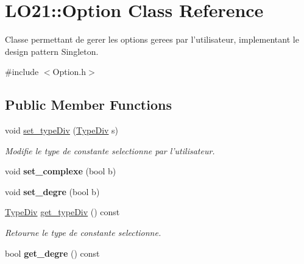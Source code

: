 \hypertarget{class_l_o21_1_1_option}{\section{\-L\-O21\-:\-:\-Option \-Class \-Reference}
\label{class_l_o21_1_1_option}
}


\-Classe permettant de gerer les options gerees par l'utilisateur, implementant le design pattern \-Singleton.  




{\ttfamily \#include $<$\-Option.\-h$>$}

\subsection*{\-Public \-Member \-Functions}
\begin{DoxyCompactItemize}
\item 
void \hyperlink{class_l_o21_1_1_option_a22b390cfd4b7ac74b656549d0a4b9e5a}{set\-\_\-type\-Div} (\hyperlink{_option_8h_aa88892c4cb734ae333411b4409f27f72}{\-Type\-Div} s)
\begin{DoxyCompactList}\small\item\em \-Modifie le type de constante selectionne par l'utilisateur. \end{DoxyCompactList}\item 
\hypertarget{class_l_o21_1_1_option_a9c7b2191e0dd3daa235a43aafa317126}{void {\bfseries set\-\_\-complexe} (bool b)}\label{class_l_o21_1_1_option_a9c7b2191e0dd3daa235a43aafa317126}

\item 
\hypertarget{class_l_o21_1_1_option_aa5de72b352852815e35d205796f04d77}{void {\bfseries set\-\_\-degre} (bool b)}\label{class_l_o21_1_1_option_aa5de72b352852815e35d205796f04d77}

\item 
\hyperlink{_option_8h_aa88892c4cb734ae333411b4409f27f72}{\-Type\-Div} \hyperlink{class_l_o21_1_1_option_af694fc0bcf5628c360aaddd371f71975}{get\-\_\-type\-Div} () const 
\begin{DoxyCompactList}\small\item\em \-Retourne le type de constante selectionne. \end{DoxyCompactList}\item 
\hypertarget{class_l_o21_1_1_option_abdd291391f98c3cfebb1269d73c991b6}{bool {\bfseries get\-\_\-degre} () const }\label{class_l_o21_1_1_option_abdd291391f98c3cfebb1269d73c991b6}


\end{DoxyCompactItemize}
